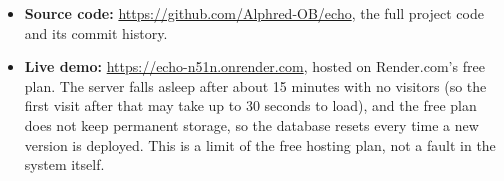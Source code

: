 \begin{itemize}
  \item \textbf{Source code:} \url{https://github.com/Alphred-OB/echo}, the full project code and its commit history.
  \item \textbf{Live demo:} \url{https://echo-n51n.onrender.com}, hosted on Render.com's free plan. The server falls asleep after about 15 minutes with no visitors (so the first visit after that may take up to 30 seconds to load), and the free plan does not keep permanent storage, so the database resets every time a new version is deployed. This is a limit of the free hosting plan, not a fault in the system itself.
\end{itemize}
